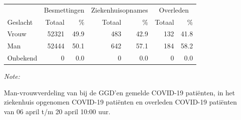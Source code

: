 \documentclass[
  english,
  man,floatsintext]{apa6}
\begin{document}
\begin{table}
\centering\begingroup\fontsize{11}{13}\selectfont

\begin{threeparttable}
\begin{tabular}{lrrrrrr}
\toprule
\multicolumn{1}{c}{ } & \multicolumn{2}{c}{Besmettingen} & \multicolumn{2}{c}{Ziekenhuisopnames} & \multicolumn{2}{c}{Overleden} \\
\cmidrule(l{3pt}r{3pt}){2-3} \cmidrule(l{3pt}r{3pt}){4-5} \cmidrule(l{3pt}r{3pt}){6-7}
Geslacht & Totaal & \% & Totaal & \% & Totaal & \%\\
\midrule
Vrouw & 52321 & 49.9 & 483 & 42.9 & 132 & 41.8\\
Man & 52444 & 50.1 & 642 & 57.1 & 184 & 58.2\\
Onbekend & 0 & 0.0 & 0 & 0.0 & 0 & 0.0\\
\bottomrule
\end{tabular}
\begin{tablenotes}
\item \textit{Note: } 
\item Man-vrouwverdeling van bij de GGD’en gemelde COVID-19 patiënten, in het ziekenhuis opgenomen COVID-19 patiënten en overleden COVID-19 patiënten van 06 april t/m 20 april 10:00 uur.
\end{tablenotes}
\end{threeparttable}
\endgroup{}
\end{table}
\newpage
\end{document}
